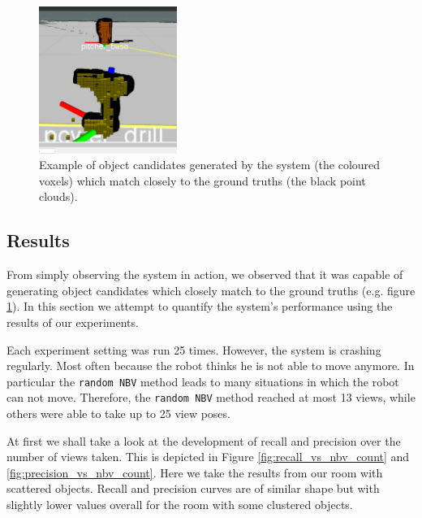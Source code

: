 \documentclass[a4paper,11pt,english]{article}
\begin{document}
\begin{figure}[h]
	\begin{center}
		\includegraphics[width=0.4\textwidth]{src/drill2.png}
		\caption{Example of object candidates generated by the system (the coloured voxels) which match closely to the ground truths (the black point clouds).}
		\label{fig:good_results}
	\end{center}
\end{figure}

\subsection{Results}
From simply observing the system in action, we observed that it was capable of generating object candidates which closely match to the ground truths (e.g. figure \ref{fig:good_results}).
In this section we attempt to quantify the system's performance using the results of our experiments.

Each experiment setting was run 25 times.
However, the system is crashing regularly. Most often because the robot thinks he is not able to move anymore.
In particular the \texttt{random NBV} method leads to many situations in which the robot can not move. Therefore, the \texttt{random NBV} method reached at most 13 views, while others were able to take up to 25 view poses.

At first we shall take a look at the development of recall and precision over the number of views taken.
This is depicted in Figure \ref{fig:recall_vs_nbv_count} and \ref{fig:precision_vs_nbv_count}.
Here we take the results from our room with scattered objects. Recall and precision curves are of similar shape but with slightly lower values overall for the room with some clustered objects.
\end{document}
